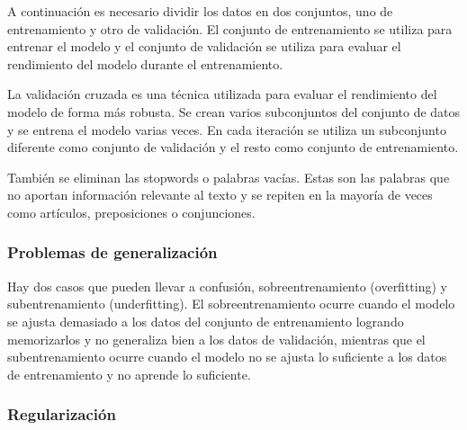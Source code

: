 A continuación es necesario dividir los datos en dos conjuntos, uno de entrenamiento y otro de validación.
El conjunto de entrenamiento se utiliza para entrenar el modelo y el conjunto de validación se utiliza para evaluar el rendimiento del modelo durante el entrenamiento.

La validación cruzada es una técnica utilizada para evaluar el rendimiento del modelo de forma más robusta.
Se crean varios subconjuntos del conjunto de datos y se entrena el modelo varias veces. En cada iteración se utiliza un subconjunto diferente como conjunto de validación y el resto como conjunto de entrenamiento.

También se eliminan las stopwords o palabras vacías. Estas son las palabras que no aportan información relevante al texto y se repiten en la mayoría de veces como artículos, preposiciones o conjunciones.

\subsubsection{Problemas de generalización}

Hay dos casos que pueden llevar a confusión, sobreentrenamiento (overfitting) y subentrenamiento (underfitting).
El sobreentrenamiento ocurre cuando el modelo se ajusta demasiado a los datos del conjunto de entrenamiento logrando memorizarlos y no generaliza bien a los datos de validación, mientras que el subentrenamiento ocurre cuando el modelo no se ajusta lo suficiente a los datos de entrenamiento y no aprende lo suficiente.

\subsubsection{Regularización}

